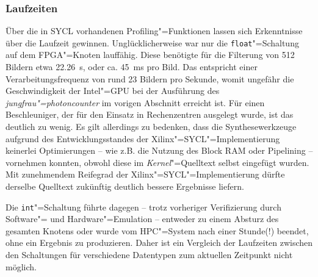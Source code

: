 \subsubsection{Laufzeiten}

Über die in SYCL vorhandenen Profiling"=Funktionen lassen sich Erkenntnisse über
die Laufzeit gewinnen. Unglücklicherweise war nur die \texttt{float}"=Schaltung
auf dem FPGA"=Knoten lauffähig. Diese benötigte für die Filterung von
512 Bildern etwa \SI{22.26}{\second}, oder ca. \SI{45}{\milli\second} pro Bild.
Das entspricht einer Verarbeitungsfrequenz von rund 23 Bildern pro Sekunde,
womit ungefähr die Geschwindigkeit der Intel"=GPU bei der Ausführung des
\textit{jungfrau"=photoncounter} im vorigen Abschnitt erreicht ist. Für einen
Beschleuniger, der für den Einsatz in Rechenzentren ausgelegt wurde, ist das
deutlich zu wenig. Es gilt allerdings zu bedenken, dass die Synthesewerkzeuge
aufgrund des Entwicklungsstandes der Xilinx"=SYCL"=Implementierung keinerlei
Optimierungen -- wie z.B. die Nutzung des Block RAM oder Pipelining -- vornehmen
konnten, obwohl diese im \textit{Kernel}"=Quelltext selbst eingefügt wurden. Mit
zunehmendem Reifegrad der Xilinx"=SYCL"=Implementierung dürfte derselbe
Quelltext zukünftig deutlich bessere Ergebnisse liefern.

Die \texttt{int}"=Schaltung führte dagegen -- trotz vorheriger Verifizierung
durch Software"= und Hardware"=Emulation -- entweder zu einem Absturz des
gesamten Knotens oder wurde vom HPC"=System nach einer Stunde(!) beendet, ohne
ein Ergebnis zu produzieren. Daher ist ein Vergleich der Laufzeiten zwischen
den Schaltungen für verschiedene Datentypen zum aktuellen Zeitpunkt nicht
möglich.
